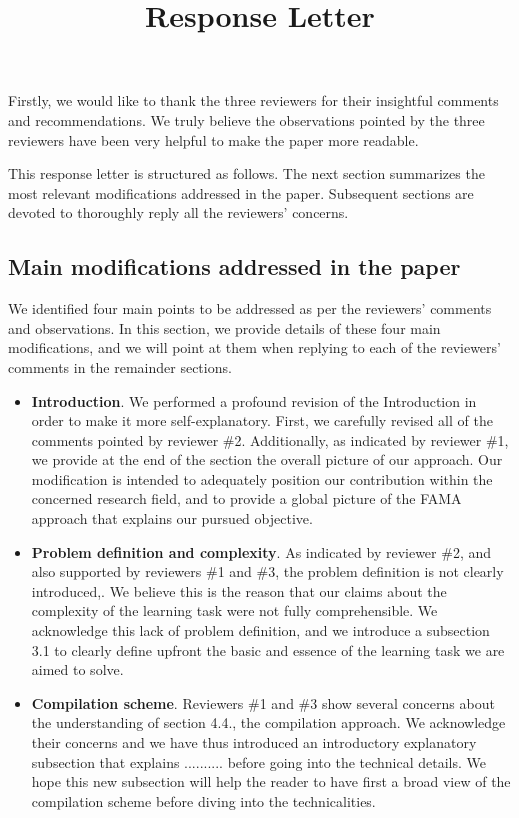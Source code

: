\documentclass{article}
\title{\textbf{Response Letter}}
\newcommand{\FAMA}{{\small {\sffamily FAMA}}\xspace}
\begin{document}
\maketitle



Firstly, we would like to thank the three reviewers for their insightful comments and recommendations. We truly believe the observations pointed by the three reviewers have been very helpful to make the paper more readable.

This response letter is structured as follows. The next section summarizes the most relevant modifications addressed in the paper. Subsequent sections are devoted to thoroughly reply all the reviewers' concerns.


\subsection*{Main modifications addressed in the paper}

We identified four main points to be addressed as per the reviewers' comments and observations. In this section, we provide details of these four main modifications, and we will point at them when replying to each of the reviewers' comments in the remainder sections. 

\begin{itemize}
\item \textbf{Introduction}. We performed a profound revision of the Introduction in order to make it more self-explanatory. First, we carefully revised all of the comments pointed by reviewer \#2. Additionally, as indicated by reviewer \#1, we provide at the end of the section the overall picture of our approach. Our modification is intended to adequately position our contribution within the concerned research field, and to provide a global picture of the \FAMA approach that explains our pursued objective.
    
\item \textbf{Problem definition and complexity}. As indicated by reviewer \#2, and also supported by reviewers \#1 and \#3, the problem definition is not clearly introduced,. We believe this is the reason that our claims about the complexity of the learning task were not fully comprehensible. We acknowledge this lack of problem definition, and we introduce a subsection 3.1 to clearly define upfront the basic and essence of the learning task we are aimed to solve.

\item \textbf{Compilation scheme}. Reviewers \#1 and \#3 show several concerns about the understanding of section 4.4., the compilation approach. We acknowledge their concerns and we have thus introduced an introductory explanatory subsection that explains .......... before going into the technical details. We hope this new subsection will help the reader to have first a broad view of the compilation scheme before diving into the technicalities.

\end{itemize}
\end{document}
